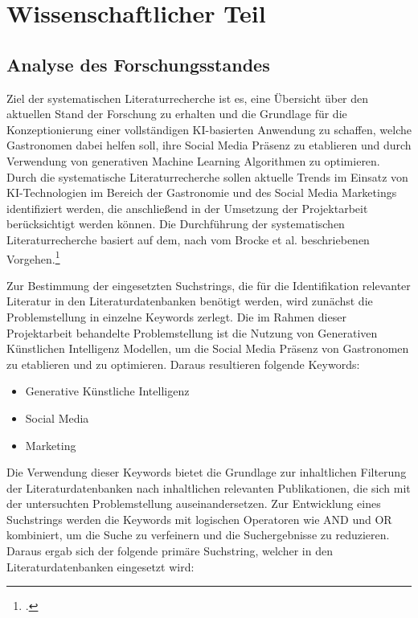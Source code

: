 \newpage
\section{Wissenschaftlicher Teil}

\subsection{Analyse des Forschungsstandes}
Ziel der systematischen Literaturrecherche ist es, eine Übersicht über den aktuellen Stand der Forschung zu erhalten und die Grundlage für die Konzeptionierung einer vollständigen KI-basierten Anwendung zu schaffen, welche Gastronomen dabei helfen soll, ihre Social Media Präsenz zu etablieren und durch Verwendung von generativen Machine Learning Algorithmen zu optimieren.
Durch die systematische Literaturrecherche sollen aktuelle Trends im Einsatz von KI-Technologien im Bereich der Gastronomie und des Social Media Marketings identifiziert werden, die anschließend in der Umsetzung der Projektarbeit berücksichtigt werden können.
Die Durchführung der systematischen Literaturrecherche basiert auf dem, nach vom Brocke et al. beschriebenen Vorgehen.\footcite{brocke2015standing}

Zur Bestimmung der eingesetzten Suchstrings, die für die Identifikation relevanter Literatur in den Literaturdatenbanken benötigt werden, wird zunächst die Problemstellung in einzelne Keywords zerlegt.
Die im Rahmen dieser Projektarbeit behandelte Problemstellung ist die Nutzung von Generativen Künstlichen Intelligenz Modellen, um die Social Media Präsenz von Gastronomen zu etablieren und zu optimieren.
Daraus resultieren folgende Keywords:

\begin{itemize}
    \item Generative Künstliche Intelligenz
    \item Social Media
    \item Marketing
\end{itemize}

Die Verwendung dieser Keywords bietet die Grundlage zur inhaltlichen Filterung der Literaturdatenbanken nach inhaltlichen relevanten Publikationen, die sich mit der untersuchten Problemstellung auseinandersetzen.
Zur Entwicklung eines Suchstrings werden die Keywords mit logischen Operatoren wie AND und OR kombiniert, um die Suche zu verfeinern und die Suchergebnisse zu reduzieren.
Daraus ergab sich der folgende primäre Suchstring, welcher in den Literaturdatenbanken eingesetzt wird:

